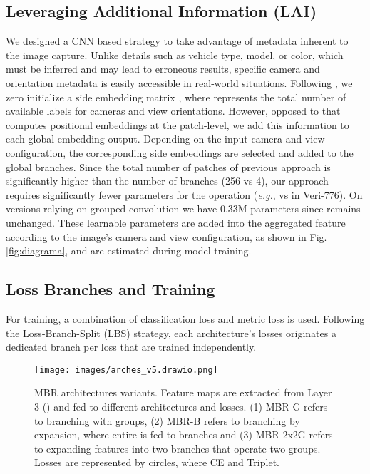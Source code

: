 \documentclass[letterpaper, 10pt, conference]{ieeeconf}
\begin{document}
\subsection{Leveraging Additional Information (LAI)}
We designed a CNN based strategy to take advantage of metadata inherent to the image capture. 
Unlike details such as vehicle type, model, or color, which must be inferred and may lead to erroneous results, specific camera and orientation metadata is easily accessible in real-world situations.
Following \cite{he2021transreid}, we zero initialize a side embedding matrix , where  represents the total number of available labels for cameras and view orientations.
However, opposed to \cite{he2021transreid} that computes positional embeddings at the patch-level, we add this information to each  global embedding output. Depending on the input camera  and view  configuration, the corresponding side embeddings  are selected and added to the global branches. Since the total number of patches of previous approach is significantly higher than the number of branches (256 vs 4), our approach requires significantly fewer parameters for the operation (\textit{e.g.},  vs  in Veri-776). 
On versions relying on grouped convolution we have 0.33M parameters since  remains unchanged. 
These learnable parameters are added into the aggregated feature according to the image's camera and view configuration, as shown in Fig.\ref{fig:diagrama}, and are estimated during model training.

\subsection{Loss Branches and Training}
For training, a combination of classification loss and metric loss is used. Following the Loss-Branch-Split (LBS) strategy, each architecture's losses originates a dedicated branch per loss that are trained independently.

\begin{figure*}[hbt!]
\centerline{{\texttt{[image: images/arches\_v5.drawio.png]}}}

\caption{MBR architectures variants. Feature maps are extracted from Layer 3 () and fed to different architectures and losses. (1) MBR-G refers to branching with  groups, (2) MBR-B refers to branching by expansion, where entire  is fed to  branches and (3) MBR-2x2G refers to expanding features into two branches that operate two groups. Losses are represented by circles, where  CE and  Triplet. 
} 

\label{fig:arches_ablate}
\end{figure*}
\end{document}
